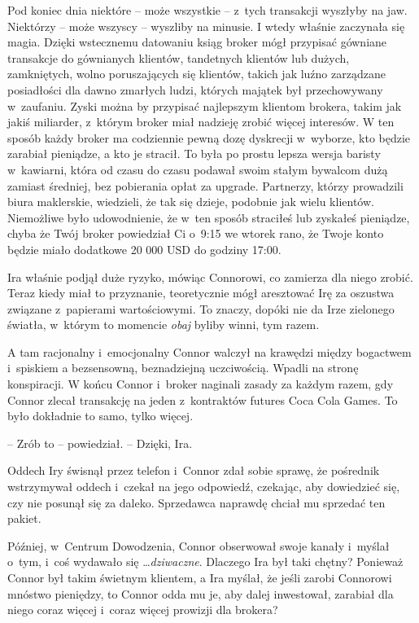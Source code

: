 \documentclass[oneside,polish,11pt,rmheadings]{mwbk}
\begin{document}
Pod koniec dnia niektóre -- może wszystkie -- z~tych transakcji wyszłyby na jaw. Niektórzy -- może wszyscy -- wyszliby na minusie. I wtedy właśnie zaczynała się magia. Dzięki wstecznemu datowaniu ksiąg broker mógł przypisać gówniane transakcje do gównianych klientów, tandetnych klientów lub dużych, zamkniętych, wolno poruszających się klientów, takich jak luźno zarządzane posiadłości dla dawno zmarłych ludzi, których majątek był przechowywany w~zaufaniu. Zyski można by przypisać najlepszym klientom brokera, takim jak jakiś miliarder, z~którym broker miał nadzieję zrobić więcej interesów. W ten sposób każdy broker ma codziennie pewną dozę dyskrecji w~wyborze, kto będzie zarabiał pieniądze, a kto je stracił. To była po prostu lepsza wersja baristy w~kawiarni, która od czasu do czasu podawał swoim stałym bywalcom dużą zamiast średniej, bez pobierania opłat za upgrade. Partnerzy, którzy prowadzili biura maklerskie, wiedzieli, że tak się dzieje, podobnie jak wielu klientów. Niemożliwe było udowodnienie, że w~ten sposób straciłeś lub zyskałeś pieniądze, chyba że Twój broker powiedział Ci o~9:15 we wtorek rano, że Twoje konto będzie miało dodatkowe 20 000 USD do godziny 17:00.

Ira właśnie podjął duże ryzyko, mówiąc Connorowi, co zamierza dla niego zrobić. Teraz kiedy miał to przyznanie, teoretycznie mógł aresztować Irę za oszustwa związane z~papierami wartościowymi. To znaczy, dopóki nie da Irze zielonego światła, w~którym to momencie \textit{obaj }byliby winni, tym razem.

A tam racjonalny i~emocjonalny Connor walczył na krawędzi między bogactwem i~spiskiem a bezsensowną, beznadziejną uczciwością. Wpadli na stronę konspiracji. W końcu Connor i~broker naginali zasady za każdym razem, gdy Connor zlecał transakcję na jeden z~kontraktów futures Coca Cola Games. To było dokładnie to samo, tylko więcej.

-- Zrób to -- powiedział. -- Dzięki, Ira.

Oddech Iry świsnął przez telefon i~Connor zdał sobie sprawę, że pośrednik wstrzymywał oddech i~czekał na jego odpowiedź, czekając, aby dowiedzieć się, czy nie posunął się za daleko. Sprzedawca naprawdę chciał mu sprzedać ten pakiet.

Później, w~Centrum Dowodzenia, Connor obserwował swoje kanały i~myślał o~tym, i~coś wydawało się \ldots  \textit{dziwaczne}. Dlaczego Ira był taki chętny? Ponieważ Connor był takim świetnym klientem, a Ira myślał, że jeśli zarobi Connorowi mnóstwo pieniędzy, to Connor odda mu je, aby dalej inwestował, zarabiał dla niego coraz więcej i~coraz więcej prowizji dla brokera?
\end{document}
